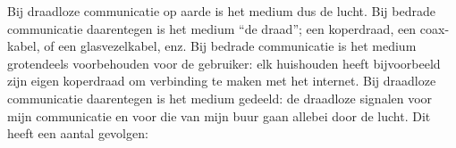  Bij draadloze communicatie op aarde is het medium dus de lucht. 
 Bij bedrade communicatie daarentegen is het medium \textquotedblleft de draad\textquotedblright; een koperdraad, een coax-kabel, of een glasvezelkabel, enz. Bij bedrade communicatie is het medium grotendeels voorbehouden voor de gebruiker: elk huishouden heeft bijvoorbeeld zijn eigen koperdraad om verbinding te maken met het internet.
 Bij draadloze communicatie daarentegen is het medium gedeeld: de draadloze signalen voor mijn communicatie en voor die van mijn buur gaan allebei door de lucht. Dit heeft een aantal gevolgen:
